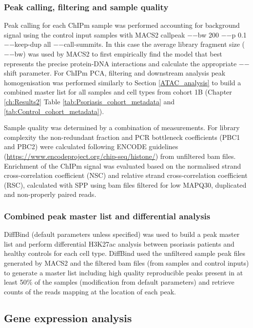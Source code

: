 \subsubsection{Peak calling, filtering and sample quality}
Peak calling for each ChIPm sample was performed accounting for background signal using the control input samples with MACS2 callpeak $-$$-$bw 200 $-$$-$p 0.1 $-$$-$keep-dup all $-$$-$call-summits. In this case the average library fragment size ($-$$-$bw) was used by MACS2 to first empirically find the model that best represents the precise protein-DNA interactions and calculate the appropriate $-$$-$shift parameter. For ChIPm PCA, filtering and downstream analysis peak homogenisation was performed similarly to Section \ref{ATAC_analysis} to build a combined master list for all samples and cell types from cohort 1B (Chapter \ref{ch:Results2} Table \ref{tab:Psoriasis_cohort_metadata} and \ref{tab:Control_cohort_metadata}).

Sample quality was determined by a combination of measurements. For library complexity the non-redundant fraction and PCR bottleneck coefficients (PBC1 and PBC2) were calculated following ENCODE guidelines (\url{https://www.encodeproject.org/chip-seq/histone/}) from unfiltered bam files. Enrichment of the ChIPm signal was evaluated based on the normalised strand cross-correlation coefficient (NSC) and relative strand cross-correlation coefficient (RSC), calculated with SPP using bam files filtered for low MAPQ30, duplicated and non-properly paired reads.

\subsubsection{Combined peak master list and differential analysis}
DiffBind (default parameters unless specified) was used to build a peak master list and perform differential H3K27ac analysis between psoriasis patients and healthy controls for each cell type. DiffBind used the unfiltered sample peak files generated by MACS2 and the filtered bam files (from samples and control inputs) to generate a master list including high quality reproducible peaks present in at least 50\% of the samples (modification from default parameters) and retrieve counts of the reads mapping at the location of each peak.



\subsection{Gene expression analysis}

